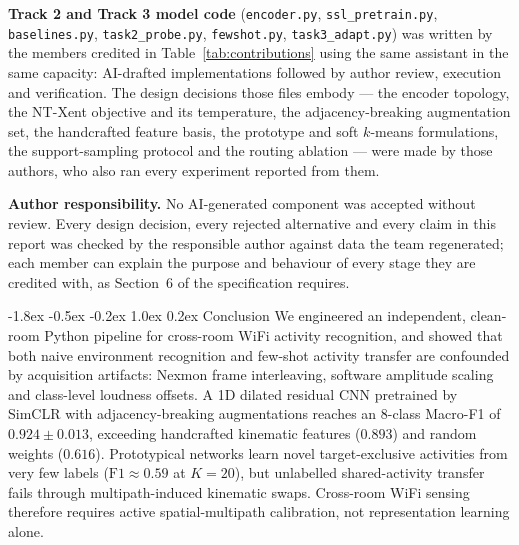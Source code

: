 \documentclass[10pt,a4paper]{article}
\makeatletter
\renewcommand{\section}{\@startsection{section}{1}{\z@}%
  {-1.8ex \@plus -0.5ex \@minus -0.2ex}%
  {1.0ex \@plus 0.2ex}%
  {\normalfont\large\bfseries\color{primary}}}
\makeatother
\begin{document}
\noindent\textbf{Track 2 and Track 3 model code} (\texttt{encoder.py}, \texttt{ssl\_pretrain.py},
\texttt{baselines.py}, \texttt{task2\_probe.py}, \texttt{fewshot.py}, \texttt{task3\_adapt.py}) was written by
the members credited in Table~\ref{tab:contributions} using the same assistant in the same capacity:
AI-drafted implementations followed by author review, execution and verification. The design decisions
those files embody --- the encoder topology, the NT-Xent objective and its temperature, the
adjacency-breaking augmentation set, the handcrafted feature basis, the prototype and soft $k$-means
formulations, the support-sampling protocol and the routing ablation --- were made by those authors, who
also ran every experiment reported from them.

\noindent\textbf{Author responsibility.} No AI-generated component was accepted without review. Every
design decision, every rejected alternative and every claim in this report was checked by the responsible
author against data the team regenerated; each member can explain the purpose and behaviour of every stage
they are credited with, as Section~6 of the specification requires.

\section{Conclusion}
We engineered an independent, clean-room Python pipeline for cross-room WiFi activity recognition, and showed that both naive environment recognition and few-shot activity transfer are confounded by acquisition artifacts: Nexmon frame interleaving, software amplitude scaling and class-level loudness offsets. A 1D dilated residual CNN pretrained by SimCLR with adjacency-breaking augmentations reaches an 8-class Macro-F1 of $\mathbf{0.924 \pm 0.013}$, exceeding handcrafted kinematic features ($0.893$) and random weights ($0.616$). Prototypical networks learn novel target-exclusive activities from very few labels ($\text{F1} \approx 0.59$ at $K=20$), but unlabelled shared-activity transfer fails through multipath-induced kinematic swaps. Cross-room WiFi sensing therefore requires active spatial-multipath calibration, not representation learning alone.
\end{document}
